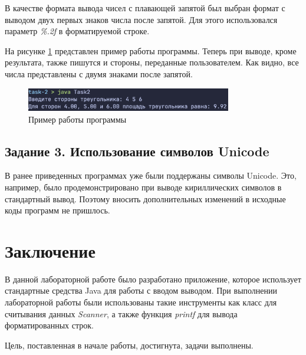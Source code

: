 \documentclass[a4paper, 14pt]{extarticle}
\begin{document}
В качестве формата вывода чисел с плавающей запятой был выбран формат с выводом
двух первых знаков числа после запятой. Для этого использовался параметр
\textit{\%.2f} в форматируемой строке.

На рисунке \ref{fig:task-2} представлен пример работы программы. Теперь при
выводе, кроме результата, также пишутся и стороны, переданные пользователем. Как
видно, все числа представлены с двумя знаками после запятой.

\begin{figure}[H]
  \centering
  \includegraphics[width=0.8\textwidth]{images/task-2.png}
  \caption{Пример работы программы}
  \label{fig:task-2}
\end{figure}

\subsection*{Задание 3. Использование символов Unicode}

В ранее приведенных программах уже были поддержаны символы Unicode. Это,
например, было продемонстрировано при выводе кириллических символов в
стандартный вывод. Поэтому вносить дополнительных изменений в исходные коды
программ не пришлось.

\section*{Заключение}

В данной лабораторной работе было разработано приложение, которое использует
стандартные средства Java для работы с вводом выводом. При выполнении
лабораторной работы были использованы такие инструменты как класс для считывания
данных \textit{Scanner}, а также функция \textit{printf} для вывода
форматированных строк.

Цель, поставленная в начале работы, достигнута, задачи выполнены.
\end{document}
